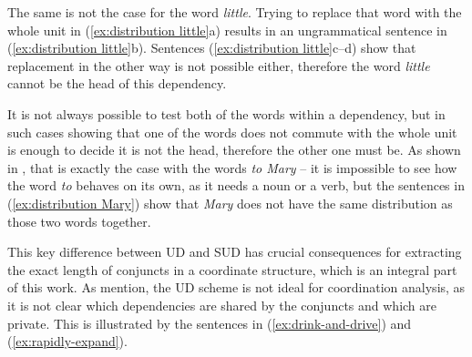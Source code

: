 The same is not the case for the word \textsl{little}. Trying to replace that word with the whole unit in (\ref{ex:distribution little}a) results in an ungrammatical sentence in (\ref{ex:distribution little}b). Sentences (\ref{ex:distribution little}c--d) show that replacement in the other way is not possible either, therefore the word \textsl{little} cannot be the head of this dependency.

\begin{exe}
    \ex
    \label{ex:distribution little}
	\begin{xlist}
    \end{xlist}
\end{exe}

It is not always possible to test both of the words within a dependency, but in such cases showing that one of the words does not commute with the whole unit is enough to decide it is not the head, therefore the other one must be. As shown in \cite{gerdes-etal-2018-sud}, that is exactly the case with the words \textsl{to Mary} -- it is impossible to see how the word \textsl{to} behaves on its own, as it needs a noun or a verb, but the sentences in (\ref{ex:distribution Mary}) show that \textsl{Mary} does not have the same distribution as those two words together.

\begin{exe}
    \ex
    \label{ex:distribution Mary}
    \begin{xlist}
    \end{xlist}
\end{exe}

This key difference between UD and SUD has crucial consequences for extracting the exact length of conjuncts in a coordinate structure, which is an integral part of this work. As \cite{prz:woz:23} mention, the UD scheme is not ideal for coordination analysis, as it is not clear which dependencies are shared by the conjuncts and which are private. This is illustrated by the sentences in (\ref{ex:drink-and-drive}) and (\ref{ex:rapidly-expand}).


